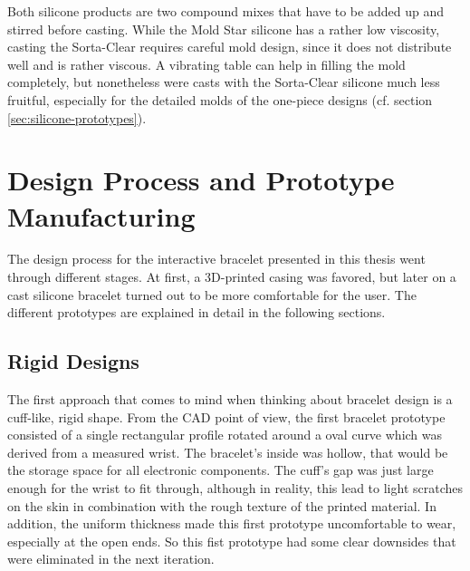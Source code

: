 Both silicone products are two compound mixes that have to be added up and stirred before casting. While the Mold Star silicone has a rather low viscosity, casting the Sorta-Clear requires careful mold design, since it does not distribute well and is rather viscous. A vibrating table can help in filling the mold completely, but nonetheless were casts with the Sorta-Clear silicone much less fruitful, especially for the detailed molds of the one-piece designs (cf. section \ref{sec:silicone-prototypes}).

\section{Design Process and Prototype Manufacturing}

The design process for the interactive bracelet presented in this thesis went through different stages. At first, a 3D-printed casing was favored, but later on a cast silicone bracelet turned out to be more comfortable for the user. The different prototypes are explained in detail in the following sections.

\subsection{Rigid Designs}

The first approach that comes to mind when thinking about bracelet design is a cuff-like, rigid shape. From the CAD point of view, the first bracelet prototype consisted of a single rectangular profile rotated around a oval curve which was derived from a measured wrist. The bracelet's inside was hollow, that would be the storage space for all electronic components. The cuff's gap was just large enough for the wrist to fit through, although in reality, this lead to light scratches on the skin in combination with the rough texture of the printed material. In addition, the uniform thickness made this first prototype uncomfortable to wear, especially at the open ends. So this fist prototype had some clear downsides that were eliminated in the next iteration.

